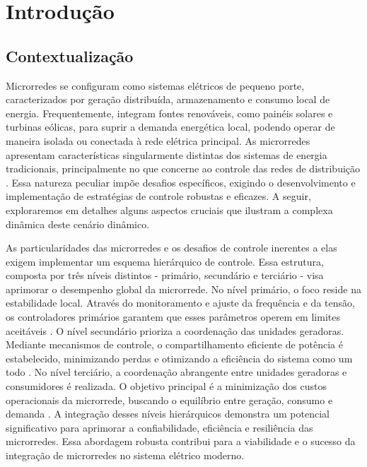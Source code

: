 
\chapter{Introdução}

\section{Contextualização}

Microrredes se configuram como sistemas elétricos de pequeno porte, caracterizados por geração distribuída, armazenamento e consumo local de energia. Frequentemente, integram fontes renováveis, como painéis solares e turbinas eólicas, para suprir a demanda energética local, podendo operar de maneira isolada ou conectada à rede elétrica principal. As microrredes apresentam características singularmente distintas dos sistemas de energia tradicionais, principalmente no que concerne ao controle das redes de distribuição \citep{Paigi2013}. Essa natureza peculiar impõe desafios específicos, exigindo o desenvolvimento e implementação de estratégias de controle robustas e eficazes. A seguir, exploraremos em detalhes alguns aspectos cruciais que ilustram a complexa dinâmica deste cenário dinâmico.

As particularidades das microrredes e os desafios de controle inerentes a elas exigem implementar um esquema hierárquico de controle. Essa estrutura, composta por três níveis distintos - primário, secundário e terciário - visa aprimorar o desempenho global da microrrede. No nível primário, o foco reside na estabilidade local. Através do monitoramento e ajuste da frequência e da tensão, os controladores primários garantem que esses parâmetros operem em limites aceitáveis \citep{Paigi2013}. O nível secundário prioriza a coordenação das unidades geradoras. Mediante mecanismos de controle, o compartilhamento eficiente de potência é estabelecido, minimizando perdas e otimizando a eficiência do sistema como um todo \cite{Paigi2013}. No nível terciário, a coordenação abrangente entre unidades geradoras e consumidores é realizada. O objetivo principal é a minimização dos custos operacionais da microrrede, buscando o equilíbrio entre geração, consumo e demanda \citep{Paigi2013}. A integração desses níveis hierárquicos demonstra um potencial significativo para aprimorar a confiabilidade, eficiência e resiliência das microrredes. Essa abordagem robusta contribui para a viabilidade e o sucesso da integração de microrredes no sistema elétrico moderno.

